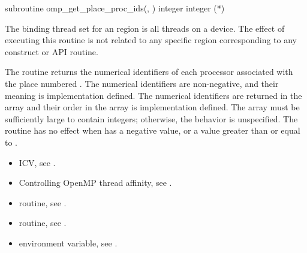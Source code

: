 \begin{fortranspecific}
\begin{ompfSubroutine}
subroutine omp_get_place_proc_ids(, )
integer 
integer (*)
\end{ompfSubroutine}
\end{fortranspecific}

\binding
The binding thread set for an  region is all
threads on a device. The effect of executing this routine is not related to
any specific region corresponding to any construct or API routine.

\effect
The  routine returns the numerical
identifiers of each processor associated with the place numbered
. The numerical identifiers are non-negative, and
their meaning is implementation defined.  The numerical identifiers
are returned in the array  and their order in the array is
implementation defined. The array must be sufficiently large to contain
\code{)} integers;
otherwise, the behavior is unspecified.  The routine has no effect when
 has a negative value, or a value greater than or equal 
to .

\crossreferences
\begin{itemize}
\item {} ICV, see
.

\item Controlling OpenMP thread affinity, see
.

\item {} routine, see
.

\item {} routine, see
.

\item {} environment variable, see
.
\end{itemize}



\subsection{}
\label{subsec:omp_get_place_num}

